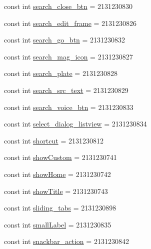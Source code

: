 \begin{CompactItemize}
const int \hyperlink{class__2doo_1_1_droid_1_1_resource_1_1_id_86696e0cfd1054093b9ff9ba89e024a3}{search\_\-close\_\-btn} = 2131230830
\item 
const int \hyperlink{class__2doo_1_1_droid_1_1_resource_1_1_id_afa535516cecca146bda583dd1f5006d}{search\_\-edit\_\-frame} = 2131230826
\item 
const int \hyperlink{class__2doo_1_1_droid_1_1_resource_1_1_id_b0d218908a4a417a7ea4bf2b4c26c263}{search\_\-go\_\-btn} = 2131230832
\item 
const int \hyperlink{class__2doo_1_1_droid_1_1_resource_1_1_id_669ac2638844cecc0684201bf2af08fb}{search\_\-mag\_\-icon} = 2131230827
\item 
const int \hyperlink{class__2doo_1_1_droid_1_1_resource_1_1_id_180dff1cb943b5061634158fb92c31cc}{search\_\-plate} = 2131230828
\item 
const int \hyperlink{class__2doo_1_1_droid_1_1_resource_1_1_id_1739454c42e7cfd04d0b29c4ff1f7b36}{search\_\-src\_\-text} = 2131230829
\item 
const int \hyperlink{class__2doo_1_1_droid_1_1_resource_1_1_id_02a9fd3bbc0535fcc69c5fb9a12a8417}{search\_\-voice\_\-btn} = 2131230833
\item 
const int \hyperlink{class__2doo_1_1_droid_1_1_resource_1_1_id_a752dcd26c85eb8c499c1e89159e88eb}{select\_\-dialog\_\-listview} = 2131230834
\item 
const int \hyperlink{class__2doo_1_1_droid_1_1_resource_1_1_id_733e2dbc6a6ed2a78fc0398ea27af228}{shortcut} = 2131230812
\item 
const int \hyperlink{class__2doo_1_1_droid_1_1_resource_1_1_id_b042d79ea6f251e6eb6fe0b82de0d7c5}{showCustom} = 2131230741
\item 
const int \hyperlink{class__2doo_1_1_droid_1_1_resource_1_1_id_423c2d59006759dc0a4eabc043d769bd}{showHome} = 2131230742
\item 
const int \hyperlink{class__2doo_1_1_droid_1_1_resource_1_1_id_8681673e9f43ef0e7ca96cb57b90155a}{showTitle} = 2131230743
\item 
const int \hyperlink{class__2doo_1_1_droid_1_1_resource_1_1_id_cb5e75c6193dfa0a93d0039b8cd3b3b9}{sliding\_\-tabs} = 2131230898
\item 
const int \hyperlink{class__2doo_1_1_droid_1_1_resource_1_1_id_f762e5aca59a463131d2fcfe1fa492e0}{smallLabel} = 2131230835
\item 
const int \hyperlink{class__2doo_1_1_droid_1_1_resource_1_1_id_2eaf0dd064bd33847ff45e0755f07ed8}{snackbar\_\-action} = 2131230842
\item 

\end{CompactItemize}
